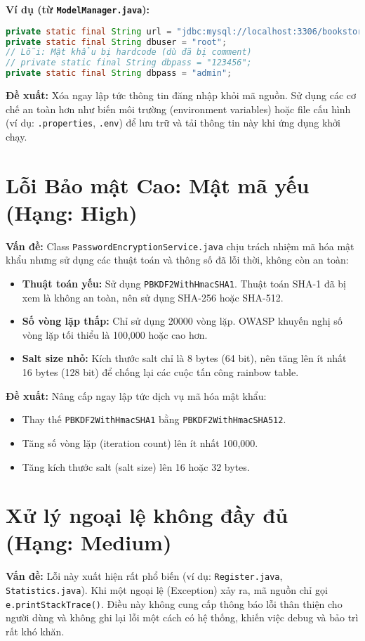 \textbf{Ví dụ (từ \texttt{ModelManager.java}):}
\begin{lstlisting}[language=Java, caption={Thông tin nhạy cảm bị hardcode (Line 8-10)}, firstnumber=8]
private static final String url = "jdbc:mysql://localhost:3306/bookstore";
private static final String dbuser = "root";
// Lỗi: Mật khẩu bị hardcode (dù đã bị comment)
// private static final String dbpass = "123456";
private static final String dbpass = "admin";
\end{lstlisting}

\textbf{Đề xuất:} Xóa ngay lập tức thông tin đăng nhập khỏi mã nguồn. Sử dụng các cơ chế an toàn hơn như biến môi trường (environment variables) hoặc file cấu hình (ví dụ: \texttt{.properties}, \texttt{.env}) để lưu trữ và tải thông tin này khi ứng dụng khởi chạy.

\section{Lỗi Bảo mật Cao: Mật mã yếu (Hạng: High)}
\textbf{Vấn đề:} Class \texttt{PasswordEncryptionService.java} chịu trách nhiệm mã hóa mật khẩu nhưng sử dụng các thuật toán và thông số đã lỗi thời, không còn an toàn:
\begin{itemize}
    \item \textbf{Thuật toán yếu:} Sử dụng \texttt{PBKDF2WithHmacSHA1}. Thuật toán SHA-1 đã bị xem là không an toàn, nên sử dụng SHA-256 hoặc SHA-512.
    \item \textbf{Số vòng lặp thấp:} Chỉ sử dụng 20000 vòng lặp. OWASP khuyến nghị số vòng lặp tối thiểu là 100,000 hoặc cao hơn.
    \item \textbf{Salt size nhỏ:} Kích thước salt chỉ là 8 bytes (64 bit), nên tăng lên ít nhất 16 bytes (128 bit) để chống lại các cuộc tấn công rainbow table.
\end{itemize}

\textbf{Đề xuất:} Nâng cấp ngay lập tức dịch vụ mã hóa mật khẩu:
\begin{itemize}
    \item Thay thế \texttt{PBKDF2WithHmacSHA1} bằng \texttt{PBKDF2WithHmacSHA512}.
    \item Tăng số vòng lặp (iteration count) lên ít nhất 100,000.
    \item Tăng kích thước salt (salt size) lên 16 hoặc 32 bytes.
\end{itemize}

\section{Xử lý ngoại lệ không đầy đủ (Hạng: Medium)}
\textbf{Vấn đề:} Lỗi này xuất hiện rất phổ biến (ví dụ: \texttt{Register.java}, \texttt{Statistics.java}). Khi một ngoại lệ (Exception) xảy ra, mã nguồn chỉ gọi \texttt{e.printStackTrace()}. Điều này không cung cấp thông báo lỗi thân thiện cho người dùng và không ghi lại lỗi một cách có hệ thống, khiến việc debug và bảo trì rất khó khăn.


